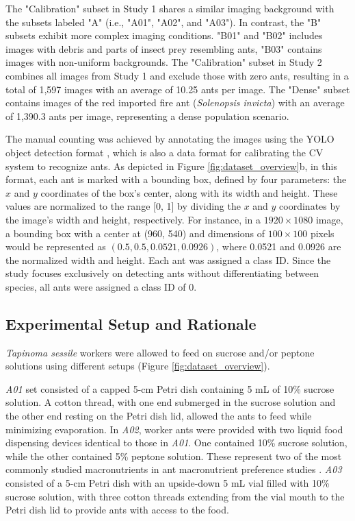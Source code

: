 The "Calibration" subset in Study 1 shares a similar imaging background with the subsets labeled "A" (i.e., "A01", "A02", and "A03"). In contrast, the "B" subsets exhibit more complex imaging conditions. "B01" and "B02" includes images with debris and parts of insect prey resembling ants, "B03" contains images with non-uniform backgrounds. The "Calibration" subset in Study 2 combines all images from Study 1 and exclude those with zero ants, resulting in a total of 1,597 images with an average of 10.25 ants per image. The "Dense" subset contains images of the red imported fire ant (\emph{Solenopsis invicta}) with an average of 1,390.3 ants per image, representing a dense population scenario.

The manual counting was achieved by annotating the images using the YOLO object detection format \cite{jocher_yolo_2023}, which is also a data format for calibrating the CV system to recognize ants. As depicted in Figure \ref{fig:dataset_overview}b, in this format, each ant is marked with a bounding box, defined by four parameters: the $x$ and $y$ coordinates of the box's center, along with its width and height. These values are normalized to the range [0, 1] by dividing the $x$ and $y$ coordinates by the image's width and height, respectively. For instance, in a $1920 \times 1080$ image, a bounding box with a center at (960, 540) and dimensions of $100 \times 100$ pixels would be represented as $(0.5, 0.5, 0.0521, 0.0926)$, where 0.0521 and 0.0926 are the normalized width and height. Each ant was assigned a class ID. Since the study focuses exclusively on detecting ants without differentiating between species, all ants were assigned a class ID of 0.

\subsection{Experimental Setup and Rationale}

\emph{Tapinoma sessile} workers were allowed to feed on sucrose and/or peptone solutions using different setups (Figure \ref{fig:dataset_overview}). 

\textit{A01} set consisted of a capped 5-cm Petri dish containing 5 mL of 10\% sucrose solution. A cotton thread, with one end submerged in the sucrose solution and the other end resting on the Petri dish lid, allowed the ants to feed while minimizing evaporation. In \textit{A02}, worker ants were provided with two liquid food dispensing devices identical to those in \textit{A01}. One contained 10\% sucrose solution, while the other contained 5\% peptone solution. These represent two of the most commonly studied macronutrients in ant macronutrient preference studies \cite{madsen_sugar_2017}. \textit{A03} consisted of a 5-cm Petri dish with an upside-down 5 mL vial filled with 10\% sucrose solution, with three cotton threads extending from the vial mouth to the Petri dish lid to provide ants with access to the food.

